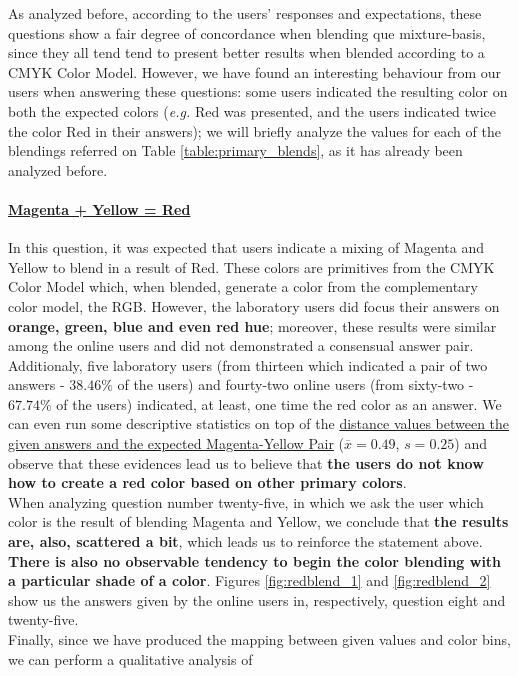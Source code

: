 %
As analyzed before, according to the users' responses and expectations, these questions show a fair degree of concordance when blending que mixture-basis, since they all tend tend to present better results when
blended according to a CMYK Color Model. However, we have found an interesting behaviour from our users when answering these questions: some users indicated the resulting color on both the expected colors (\emph{e.g.}
Red was presented, and the users indicated twice the color Red in their answers); we will briefly analyze the values for each of the blendings referred on Table \ref{table:primary_blends}, as it has already been
analyzed before.
%
\paragraph{\ul{Magenta + Yellow = Red}}
%
In this question, it was expected that users indicate a mixing of Magenta and Yellow to blend in a result of Red. These colors are primitives from the CMYK Color Model which, when blended, generate a color from the
complementary color model, the RGB. However, the laboratory users did focus their answers on \textbf{orange, green, blue and even red hue}; moreover, these results were similar among the online users and did not
demonstrated a consensual answer pair. \\
%
Additionaly, five laboratory users (from thirteen which indicated a pair of two answers - $38.46\%$ of the users) and fourty-two online users (from sixty-two - $67.74\%$ of the users) indicated, at least, one time the
red color as an answer. We can even run some descriptive statistics on top of the \ul{distance values between the given answers and the expected Magenta-Yellow Pair} ($\overline{x} = 0.49$, $s = 0.25$) and observe that
these evidences lead us to believe that \textbf{the users do not know how to create a red color based on other primary colors}. \\
%
When analyzing question number twenty-five, in which we ask the user which color is the result of blending Magenta and Yellow, we conclude that \textbf{the results are, also,
scattered a bit}, which leads us to reinforce the statement above. \textbf{There is also no observable tendency to begin the color blending with a particular shade of a color}. Figures \ref{fig:redblend_1} and
\ref{fig:redblend_2} show us the answers given by the online users in, respectively, question eight and twenty-five. \\
%
Finally, since we have produced the mapping between given values and color bins, we can perform a qualitative analysis of
